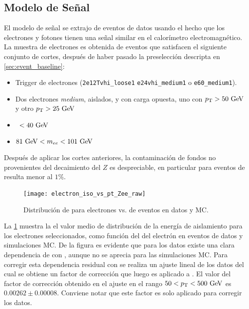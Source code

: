 \subsection{Modelo de Señal} \label{sec:jfake_sig_template}

El modelo de señal se extrajo de eventos de datos {\Zee} usando el hecho que los
electrones y fotones tienen una señal similar en el calorímetro
electromagnético. La muestra de electrones es obtenida de eventos que satisfacen
el siguiente conjunto de cortes, después de haber pasado la preselección
descripta en \cref{sec:event_baseline}:

\begin{itemize}\itemsep0.1cm
\item Trigger de electrones (\texttt{2e12Tvhi\_loose1} \texttt{e24vhi\_medium1} o
  \texttt{e60\_medium1}).
\item Dos electrones \emph{medium}, aislados, y con carga opuesta, uno con $\pt>50\gev$
  y otro $\pt>25 \gev$
\item \MET\ $<40\gev$
\item $81\gev<m_{ee}<101\gev$
\end{itemize}

Después de aplicar los cortes anteriores, la contaminación de fondos no
provenientes del decaimiento del $Z$ es despreciable, en particular para eventos
de {\ttbar} resulta menor al $1\%$.

\begin{figure}[!htbp]
  \centering
  \texttt{[image: electron\_iso\_vs\_pt\_Zee\_raw]}

  \caption{Distribución de {\etiso} para electrones vs. {\pt} de eventos {\Zee} en datos y MC.}
  \label{fig:isolation_vs_pt}
\end{figure}

La \cref{fig:isolation_vs_pt} muestra la el valor medio de distribución de la energía de
aislamiento para los electrones seleccionados, como función del {\pt} del
electrón en eventos de datos y simulaciones MC. De la figura es evidente que
para los datos existe una clara dependencia de {\etiso} con {\pt}, aunque no se
aprecia para las simulaciones MC.
Para corregir esta dependencia residual con {\pt} se realiza un ajuste lineal de los
datos del cual se obtiene un factor de corrección que luego es aplicado a {\etiso}.
El valor del factor de corrección
obtenido en el ajuste en el rango $50<\pt<500 \gev$ es $0.00262 \pm 0.00008$.
Conviene notar que este factor es solo aplicado para corregir los datos.

